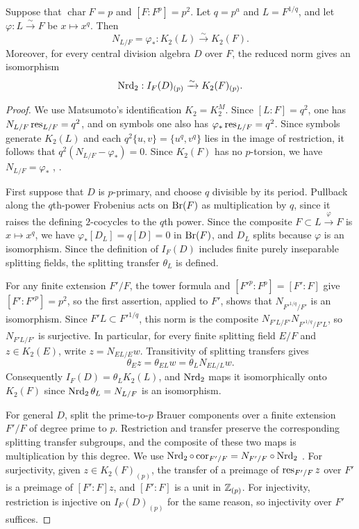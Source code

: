 \begin{lemma}
\label{lem:review-p-rank-two-frobenius-norm}
Suppose that $\operatorname{char}F=p$ and $[F:F^p]=p^2$.
Let $q=p^a$ and $L=F^{1/q}$, and let $\varphi:L\xrightarrow{\sim}F$ be $x\mapsto x^q$.
Then
\[
 N_{L/F}=\varphi_*:K_2(L)\xrightarrow{\sim}K_2(F).
\]
Moreover, for every central division algebra $D$ over $F$, the reduced norm gives an isomorphism
\[
 \operatorname{Nrd}_2:I_F(D)_{(p)}\xrightarrow{\sim}K_2(F)_{(p)}.
\]
\end{lemma}
\begin{proof}
We use Matsumoto's identification $K_2=K_2^M$.
Since $[L:F]=q^2$, one has $N_{L/F}\operatorname{res}_{L/F}=q^2$, and on symbols one also has $\varphi_*\operatorname{res}_{L/F}=q^2$.
Since symbols generate $K_2(L)$ and each $q^2\{u,v\}=\{u^q,v^q\}$ lies in the image of restriction, it follows that $q^2(N_{L/F}-\varphi_*)=0$.
Since $K_2(F)$ has no $p$-torsion, we have $N_{L/F}=\varphi_*$ \cite{Matsumoto}, \cite[\S2.4, Theorem 6]{Izhboldin2000}.

First suppose that $D$ is $p$-primary, and choose $q$ divisible by its period.
Pullback along the $q$th-power Frobenius acts on $\operatorname{Br}(F)$ as multiplication by $q$, since it raises the defining $2$-cocycles to the $q$th power.
Since the composite $F\subset L\xrightarrow{\varphi}F$ is $x\mapsto x^q$, we have $\varphi_*[D_L]=q[D]=0$ in $\operatorname{Br}(F)$, and $D_L$ splits because $\varphi$ is an isomorphism.
Since the definition of $I_F(D)$ includes finite purely inseparable splitting fields, the splitting transfer $\theta_L$ is defined.

For any finite extension $F'/F$, the tower formula and $[{F'}^p:F^p]=[F':F]$ give $[F':{F'}^p]=p^2$, so the first assertion, applied to $F'$, shows that $N_{{F'}^{1/q}/F'}$ is an isomorphism.
Since $F'L\subset{F'}^{1/q}$, this norm is the composite $N_{F'L/F'}N_{{F'}^{1/q}/F'L}$, so $N_{F'L/F'}$ is surjective.
In particular, for every finite splitting field $E/F$ and $z\in K_2(E)$, write $z=N_{EL/E}w$.
Transitivity of splitting transfers gives
\[
 \theta_Ez=\theta_{EL}w=\theta_LN_{EL/L}w.
\]
Consequently $I_F(D)=\theta_LK_2(L)$, and $\operatorname{Nrd}_2$ maps it isomorphically onto $K_2(F)$ since $\operatorname{Nrd}_2\theta_L=N_{L/F}$ is an isomorphism.

For general $D$, split the prime-to-$p$ Brauer components over a finite extension $F'/F$ of degree prime to $p$.
Restriction and transfer preserve the corresponding splitting transfer subgroups, and the composite of these two maps is multiplication by this degree.
We use $\operatorname{Nrd}_2\circ\operatorname{cor}_{F'/F}=N_{F'/F}\circ\operatorname{Nrd}_2$ \cite[Proposition 6.6.1(1)]{KahnLevine2010}.
For surjectivity, given $z\in K_2(F)_{(p)}$, the transfer of a preimage of $\operatorname{res}_{F'/F}z$ over $F'$ is a preimage of $[F':F]z$, and $[F':F]$ is a unit in $\mathbb Z_{(p)}$.
For injectivity, restriction is injective on $I_F(D)_{(p)}$ for the same reason, so injectivity over $F'$ suffices.
\end{proof}
